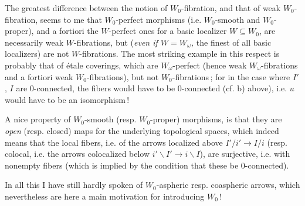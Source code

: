 \documentclass[11pt]{article}
\newcommand{\printedpage}[1]{\marginpar{\footnotesize p.~#1}}
\newcommand{\msp}[1]{\marginpar{\footnotesize [#1]}}
\begin{document}
The greatest difference between the notion of $W_0$-fibration, and that of weak $W_0$-fibration, seems to me that $W_0$-perfect morphisms (i.e. $W_0$-smooth and $W_0$-proper), and a fortiori the $W$-perfect ones for a basic localizer $W \subseteq W_0$, are necessarily weak $W$-fibrations, but (\textit{even if $W = W_\omega$,} the finest of all basic localizers) are not $W$-fibrations. The most striking example in this respect is probably that of étale coverings, which are $W_\omega$-perfect (hence
\msp{page 43}
weak $W_\omega$-fibrations and a fortiori weak $W_0$-fibrations), but not $W_0$-fibrations\,; for in the case where $I'$, $I$ are 0-connected, the fibers would have to be 0-connected (cf. b) above), i.e. $u$ would have to be an isomorphism\,!

A nice property of $W_0$-smooth (resp. $W_0$-proper) morphisms, is that they are \textit{open} (resp. closed) maps for the underlying topological spaces, which indeed means that the local fibers, i.e. of the arrows localized above $I'/i' \longrightarrow I/i$ (resp. colocal, i.e. the arrows colocalized below $i'\backslash I' \longrightarrow i\backslash I$), are surjective, i.e. with nonempty fibers (which is implied by the condition that these be 0-connected).

\printedpage{28}
In all this I have still hardly spoken of $W_0$-aspheric resp. coaspheric arrows, which nevertheless are here a main motivation for introducing $W_0$\,!
\end{document}
